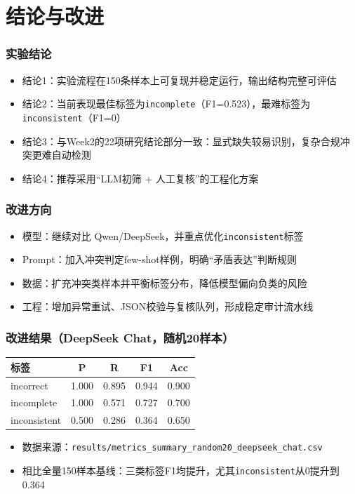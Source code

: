 \documentclass[AutoFakeBold,AutoFakeSlant]{beamer}
\begin{document}
\section{结论与改进}
\begin{frame}
    \frametitle{实验结论}
    \begin{itemize}
        \item 结论1：实验流程在150条样本上可复现并稳定运行，输出结构完整可评估
        \item 结论2：当前表现最佳标签为\texttt{incomplete}（F1=0.523），最难标签为\texttt{inconsistent}（F1=0）
        \item 结论3：与Week2的22项研究结论部分一致：显式缺失较易识别，复杂合规冲突更难自动检测
        \item 结论4：推荐采用“LLM初筛 + 人工复核”的工程化方案
    \end{itemize}
\end{frame}

\begin{frame}
    \frametitle{改进方向}
    \begin{itemize}
        \item 模型：继续对比 Qwen/DeepSeek，并重点优化\texttt{inconsistent}标签
        \item Prompt：加入冲突判定few-shot样例，明确“矛盾表达”判断规则
        \item 数据：扩充冲突类样本并平衡标签分布，降低模型偏向负类的风险
        \item 工程：增加异常重试、JSON校验与复核队列，形成稳定审计流水线
    \end{itemize}
\end{frame}

\begin{frame}
    \frametitle{改进结果（DeepSeek Chat，随机20样本）}
    \scriptsize
    \begin{tabularx}{\textwidth}{|p{1.9cm}|c|c|c|c|}
        \toprule
        \textbf{标签} & \textbf{P} & \textbf{R} & \textbf{F1} & \textbf{Acc} \\
        \midrule
        incorrect & 1.000 & 0.895 & 0.944 & 0.900 \\
        \midrule
        incomplete & 1.000 & 0.571 & 0.727 & 0.700 \\
        \midrule
        inconsistent & 0.500 & 0.286 & 0.364 & 0.650 \\
        \bottomrule
    \end{tabularx}
    \vspace{0.6em}
    \begin{itemize}
        \item 数据来源：\texttt{results/metrics\_summary\_random20\_deepseek\_chat.csv}
        \item 相比全量150样本基线：三类标签F1均提升，尤其\texttt{inconsistent}从0提升到0.364
    \end{itemize}
\end{frame}
\end{document}
